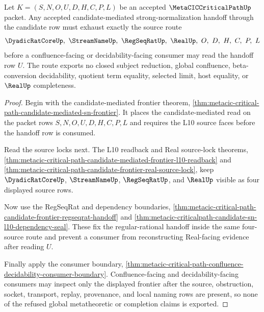 \begin{theorem}
\label{thm:metacic-critical-path-candidate-sn-handoff-source-exhaustion}
Let $K=(S,N,O,U,D,H,C,P,L)$ be an accepted $\MetaCICCriticalPathUp$ packet. Any accepted candidate-mediated strong-normalization handoff through the candidate row must exhaust exactly the source route
$$
\DyadicRatCoreUp,\ \StreamNameUp,\ \RegSeqRatUp,\ \RealUp,\ O,\ D,\ H,\ C,\ P,\ L
$$
before a confluence-facing or decidability-facing consumer may read the handoff row $U$. The route exports no closed subject reduction, global confluence, beta-conversion decidability, quotient term equality, selected limit, host equality, or $\RealUp$ completeness.
\end{theorem}
\begin{proof}
Begin with the candidate-mediated frontier theorem, \autoref{thm:metacic-critical-path-candidate-mediated-sn-frontier}. It places the candidate-mediated read on the packet rows $S,N,O,U,D,H,C,P,L$ and requires the L10 source faces before the handoff row is consumed.

Read the source locks next. The L10 readback and Real source-lock theorems, \autoref{thm:metacic-critical-path-candidate-mediated-frontier-l10-readback} and \autoref{thm:metacic-critical-path-candidate-frontier-real-source-lock}, keep $\DyadicRatCoreUp$, $\StreamNameUp$, $\RegSeqRatUp$, and $\RealUp$ visible as four displayed source rows.

Now use the RegSeqRat and dependency boundaries, \autoref{thm:metacic-critical-path-candidate-frontier-regseqrat-handoff} and \autoref{thm:metacic-criticalpath-candidate-sn-l10-dependency-seal}. These fix the regular-rational handoff inside the same four-source route and prevent a consumer from reconstructing Real-facing evidence after reading $U$.

Finally apply the consumer boundary, \autoref{thm:metacic-critical-path-confluence-decidability-consumer-boundary}. Confluence-facing and decidability-facing consumers may inspect only the displayed frontier after the source, obstruction, socket, transport, replay, provenance, and local naming rows are present, so none of the refused global metatheoretic or completion claims is exported.
\end{proof}
